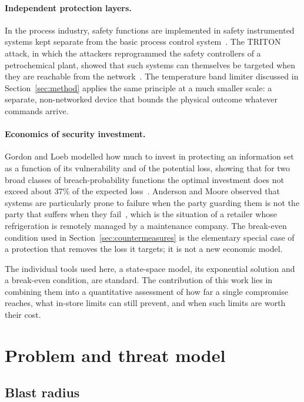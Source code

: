 \documentclass{ceurart}
\begin{document}
\paragraph{Independent protection layers.}
In the process industry, safety functions are implemented in safety instrumented systems kept separate from the basic process control system~\cite{iec61511}.
The TRITON attack, in which the attackers reprogrammed the safety controllers of a petrochemical plant, showed that such systems can themselves be targeted when they are reachable from the network~\cite{dipinto2018triton}.
The temperature band limiter discussed in Section~\ref{sec:method} applies the same principle at a much smaller scale: a separate, non-networked device that bounds the physical outcome whatever commands arrive.

\paragraph{Economics of security investment.}
Gordon and Loeb modelled how much to invest in protecting an information set as a function of its vulnerability and of the potential loss, showing that for two broad classes of breach-probability functions the optimal investment does not exceed about 37\% of the expected loss~\cite{gordon2002economics}.
Anderson and Moore observed that systems are particularly prone to failure when the party guarding them is not the party that suffers when they fail~\cite{anderson2006economics}, which is the situation of a retailer whose refrigeration is remotely managed by a maintenance company.
The break-even condition used in Section~\ref{sec:countermeasures} is the elementary special case of a protection that removes the loss it targets; it is not a new economic model.

The individual tools used here, a state-space model, its exponential solution and a break-even condition, are standard.
The contribution of this work lies in combining them into a quantitative assessment of how far a single compromise reaches, what in-store limits can still prevent, and when such limits are worth their cost.

\section{Problem and threat model}
\label{sec:problem}

\subsection{Blast radius}
\end{document}
